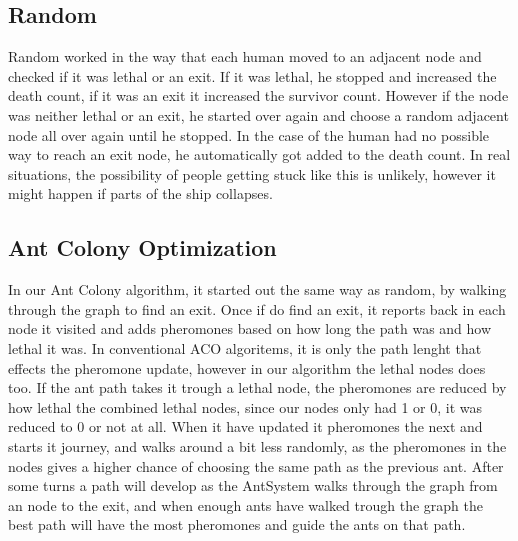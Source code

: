 \subsection{Random}
Random worked in the way that each human moved to an adjacent node and checked if it was lethal or an exit. If it was lethal, he stopped and increased the death count, if it was an exit it increased the survivor count. However if the node was neither lethal or an exit, he started over again and choose a random adjacent node all over again until he stopped. In the case of the human had no possible way to reach an exit node, he automatically got added to the death count. In real situations, the possibility of people getting stuck like this is unlikely, however it might happen if parts of the ship collapses.

\subsection{Ant Colony Optimization}
In our Ant Colony algorithm, it started out the same way as random, by walking through the graph to find an exit. Once if do find an exit, it reports back in each node it visited and adds pheromones based on how long the path was and how lethal it was. In conventional ACO algoritems, it is only the path lenght that effects the pheromone update, however in our algorithm the lethal nodes does too. If the ant path takes it trough a lethal node, the pheromones are reduced by how lethal the combined lethal nodes, since our nodes only had 1 or 0, it was reduced to 0 or not at all. When it have updated it pheromones the next and starts it journey, and walks around a bit less randomly, as the pheromones in the nodes gives a higher chance of choosing the same path as the previous ant. After some turns a path will develop as the AntSystem walks through the graph from an node to the exit, and when enough ants have walked trough the graph the best path will have the most pheromones and guide the ants on that path.





